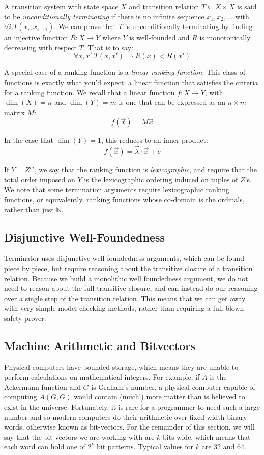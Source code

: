 \documentclass[preprint]{sigplanconf}
\theoremstyle{definition}
\begin{document}
A transition system with state space $X$ and transition relation $T \subseteq X \times X$
is said to be \emph{unconditionally terminating} if there is no infinite sequence
$x_1, x_2, \ldots$ with $\forall i . T(x_i, x_{i+1})$.  We can prove that $T$ is
unconditionally terminating by finding an injective function $R: X \to Y$ where
$Y$ is well-founded and $R$ is monotonically decreasing with respect $T$.  That is
to say:
$$\forall x, x' . T(x, x') \Rightarrow R(x) < R(x')$$

A special case of a ranking function is a \emph{linear ranking function}.  This
class of functions is exactly what you'd expect: a linear function that satisfies
the criteria for a ranking function.  We recall that a linear function $f: X \to Y$,
with $\dim(X) = n$ and $\dim(Y) = m$
is one that can be expressed as an $n \times m$ matrix $M$:
$$f(\vec{x}) = M\vec{x}$$

In the case that $\dim(Y) = 1$, this reduces to an inner product:
$$f(\vec{x}) = \vec{\lambda} \cdotp \vec{x} + c$$

If $Y = Z^m$, we say that the ranking function is \emph{lexicographic},
and require that the total order imposed on $Y$ is the lexicographic ordering
induced on tuples of $Z$'s.  We note that some termination arguments
require lexicographic ranking functions, or equivalently, ranking functions
whose co-domain is the ordinals, rather than just $\mathbb{N}$.

\subsection{Disjunctive Well-Foundedness}\label{sec:dwf}
Terminator uses disjunctive well foundedness arguments, which can be found
piece by piece, but require reasoning about the transitive closure of a transition
relation.  Because we build a monolithic well foundedness argument, we
do not need to reason about the full transitive closure, and can instead do our
reasoning over a single step of the transition relation.  This means that we
can get away with very simple model checking methods, rather than requiring
a full-blown safety prover.

\subsection{Machine Arithmetic and Bitvectors} \label{sec:machine.arith} 
Physical computers have bounded storage, which means they are unable to perform calculations on mathematical
integers.  For example, if $A$ is the Ackermann function and $G$ is Graham's number, a physical computer
capable of computing $A(G, G)$ would contain (much!) more matter than is believed to exist in the universe.
Fortunately, it is rare for a programmer to need such a large number and so modern computers do their arithmetic
over fixed-width binary words, otherwise known as bit-vectors.  For the remainder of this section, we will say that
the bit-vectors we are working with are $k$-bits wide, which means that each word can hold one of $2^k$ bit patterns.
Typical values for $k$ are 32 and 64.
\end{document}
